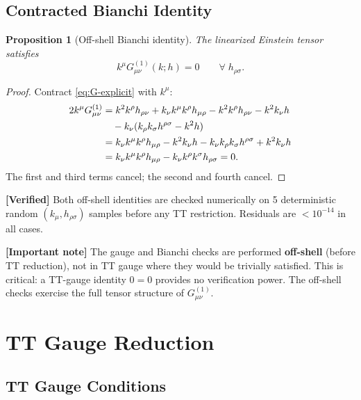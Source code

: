\documentclass[11pt,a4paper]{article}
\theoremstyle{plain}
\newtheorem{proposition}[theorem]{Proposition}
\theoremstyle{definition}
\newcommand{\verified}[1]{%
  \par\smallskip\noindent
  \colorbox{green!10}{\parbox{\dimexpr\linewidth-2\fboxsep}{%
    \textcolor{green!50!black}{\textbf{[Verified]}} #1}}%
  \par\smallskip}
\newcommand{\signcorrection}[1]{%
  \par\smallskip\noindent
  \colorbox{red!10}{\parbox{\dimexpr\linewidth-2\fboxsep}{%
    \textcolor{red!60!black}{\textbf{[Important note]}} #1}}%
  \par\smallskip}
\begin{document}
\subsection{Contracted Bianchi Identity}

\begin{proposition}[Off-shell Bianchi identity]\label{prop:bianchi}
The linearized Einstein tensor satisfies
\begin{equation}\label{eq:bianchi}
  k^\mu G^{(1)}_{\mu\nu}(k; h) = 0
  \qquad \forall\; h_{\rho\sigma}.
\end{equation}
\end{proposition}

\begin{proof}
Contract \cref{eq:G-explicit} with $k^\mu$:
\begin{align}
  2k^\mu G^{(1)}_{\mu\nu}
  &= k^2 k^\rho h_{\rho\nu} + k_\nu k^\mu k^\rho h_{\mu\rho}
  - k^2 k^\rho h_{\rho\nu} - k^2 k_\nu h\notag\\
  &\quad - k_\nu(k_\rho k_\sigma h^{\rho\sigma} - k^2 h)\notag\\
  &= k_\nu k^\mu k^\rho h_{\mu\rho} - k^2 k_\nu h
  - k_\nu k_\rho k_\sigma h^{\rho\sigma} + k^2 k_\nu h\notag\\
  &= k_\nu k^\mu k^\rho h_{\mu\rho}
  - k_\nu k^\rho k^\sigma h_{\rho\sigma} = 0.
\end{align}
The first and third terms cancel; the second and fourth cancel.
\end{proof}

\verified{Both off-shell identities are checked numerically on 5
deterministic random $(k_\mu, h_{\rho\sigma})$ samples before any
TT restriction. Residuals are $< 10^{-14}$ in all cases.}

\signcorrection{The gauge and Bianchi checks are performed
\textbf{off-shell} (before TT reduction), not in TT gauge where they
would be trivially satisfied. This is critical: a TT-gauge identity
$0 = 0$ provides no verification power. The off-shell checks
exercise the full tensor structure of $G^{(1)}_{\mu\nu}$.}

\section{TT Gauge Reduction}\label{sec:TT}

\subsection{TT Gauge Conditions}
\end{document}
